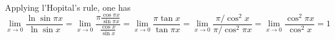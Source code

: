 \documentclass{article}
\begin{document}
\noindent
Applying l'Hopital's rule, one has
\[ \lim_{x\to0}\frac{\ln\sin\pi x}{\ln\sin x}
 = \lim_{x\to0}\frac{\pi\frac{\cos\pi x}{\sin\pi x}}{\frac{\cos x}{\sin x}}
 = \lim_{x\to0}\frac{\pi\tan x}{\tan\pi x}
 = \lim_{x\to0}\frac{\pi/\cos^2 x}{\pi/\cos^2 \pi x} 
 = \lim_{x\to0}\frac{\cos^2\pi x}{\cos^2 x} = 1 \]
\end{document}
